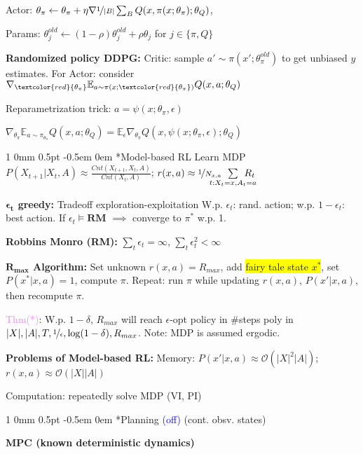\documentclass[11pt,landscape,a4paper,fleqn]{article}
\makeatletter
\newcommand*{\rsection}{%
	\@startsection{section}%
	{1}%
	{0mm}%
	{0.5pt}%
	{-0.5em \@plus 0em}
	{\color{myorange}\sffamily\small\bfseries}}
\newcommand{\mhl}[1]{\setlength{\fboxsep}{0pt}\colorbox{yellow}{#1}}
\makeatother
\begin{document}
\begin{multicols*}{4}
		Actor: $\theta_\pi  \leftarrow \theta_\pi + \eta \nabla \nicefrac{1}{|B|} \sum_B Q(x, \pi(x; \theta_\pi); \theta_Q)$,

		Params: $\theta_j^{old} \leftarrow (1 - \rho) \theta_j^{old} + \rho \theta_j$ for $j \in \{\pi, Q \}$
	\fi


	\textbf{Randomized policy DDPG:}
	Critic: sample $a' \sim \pi(x'; \theta_\pi^{old})$
	to get unbiased $y$ estimates.
	For Actor: consider $\nabla_{\textcolor{red}{\theta_\pi}} \mathbb{E}_{a \sim \pi(x; \textcolor{red}{\theta_\pi})} Q(x,a;\theta_Q)$

	Reparametrization trick: $a = \psi(x; \theta_\pi, \epsilon)$

	$\nabla_{\theta_\pi} \mathbb{E}_{a \sim \pi_{\theta_\pi}} Q(x,a;\theta_Q) = \mathbb{E}_\epsilon \nabla_{\theta_\pi} Q(x, \psi(x; \theta_\pi, \epsilon); \theta_Q)$

	\rsection*{Model-based RL} {\fontsize{9.5}{6}\selectfont Learn MDP}
	{\fontsize{9.7}{6}\selectfont $P(X_{t+1} | X_t, A) \approx \frac{Cnt(X_{t+1}, X_t, A)}{Cnt(X_t, A)}$;
		$r(x,a) \approx \nicefrac{1}{N_{x,a}} \hspace*{-5mm} \sum\limits_{t: X_t = x, A_t = a} \hspace*{-5mm} R_t$}

	\textbf{$\mathbf{\epsilon_t}$ greedy:} Tradeoff exploration-exploitation
	W.p. $\epsilon_t$: rand. action; w.p. $1 - \epsilon_t$: best action.
	If $\epsilon_t \vDash \textbf{RM}$ $\implies$ converge to $\pi^*$ w.p. 1.

	\textbf{Robbins Monro (RM):} $\sum_t \epsilon_t = \infty$, $\sum_t \epsilon_t^2 < \infty$

	\textbf{$\mathbf{R_{max}}$ Algorithm:}
	Set unknown $r(x,a) = R_{max}$, add \mhl{fairy tale state $x^*$}, set $P(x^* | x,a) = 1$, compute $\pi$.
	Repeat: run $\pi$ while updating $r(x,a)$, $P(x' | x,a)$, then recompute $\pi$.

	\textcolor{violet}{Thm(*)}: W.p. $1 - \delta$, $R_{max}$ will reach $\epsilon$-opt policy in \#steps poly in $|X|, |A|, T, \nicefrac{1}{\epsilon}, \log(1 - \delta), R_{max}$.
	Note: MDP is assumed ergodic.

	\textbf{Problems of Model-based RL:}
	Memory: $P(x'|x,a) \approx \mathcal{O}(|X|^2 |A|)$; $r(x,a) \approx \mathcal{O}(|X||A|)$

	Computation: repeatedly solve MDP (VI, PI)


	\rsection*{Planning} \textcolor{blue}{(off)} (cont. obsv. states)

	\textbf{MPC (known deterministic dynamics)}


\end{multicols*}
\end{document}
